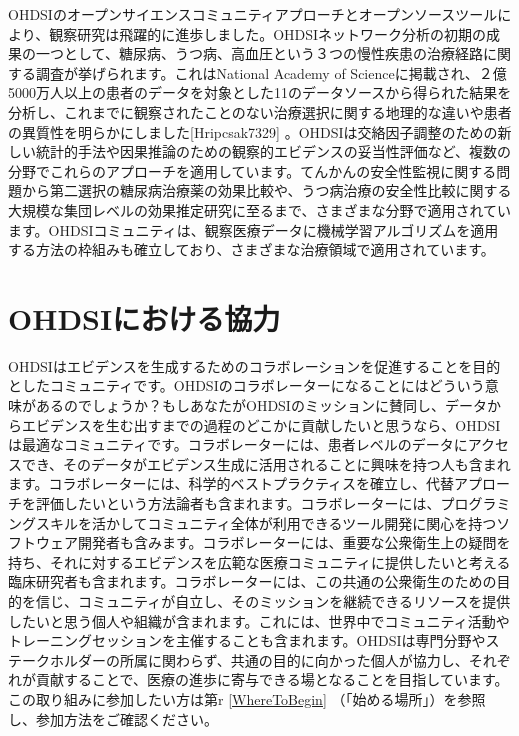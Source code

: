 \documentclass[
  11pt]{book}
\theoremstyle{definition}
\theoremstyle{definition}
\theoremstyle{definition}
\theoremstyle{definition}
\theoremstyle{remark}
\begin{document}
OHDSIのオープンサイエンスコミュニティアプローチとオープンソースツールにより、観察研究は飛躍的に進歩しました。OHDSIネットワーク分析の初期の成果の一つとして、糖尿病、うつ病、高血圧という３つの慢性疾患の治療経路に関する調査が挙げられます。これはNational Academy of Scienceに掲載され、２億5000万人以上の患者のデータを対象とした11のデータソースから得られた結果を分析し、これまでに観察されたことのない治療選択に関する地理的な違いや患者の異質性を明らかにしました{[}Hripcsak7329{]} 。OHDSIは交絡因子調整のための新しい統計的手法\citep{tian_2018}や因果推論のための観察的エビデンスの妥当性評価\citep{schuemie_2018}など、複数の分野でこれらのアプローチを適用しています。てんかんの安全性監視に関する問題\citep{duke_2017}から第二選択の糖尿病治療薬の効果比較\citep{vashisht_2018}や、うつ病治療の安全性比較に関する大規模な集団レベルの効果推定研究\citep{schuemie_2018b}に至るまで、さまざまな分野で適用されています。OHDSIコミュニティは、観察医療データに機械学習アルゴリズムを適用する方法の枠組みも確立しており\citep{reps2018}、さまざまな治療領域で適用されています。\citep{johnston_2019, cepeda_2018, reps_2019}

\section{OHDSIにおける協力}\label{ohdsiux306bux304aux3051ux308bux5354ux529b}

OHDSIはエビデンスを生成するためのコラボレーションを促進することを目的としたコミュニティです。OHDSIのコラボレーターになることにはどういう意味があるのでしょうか？もしあなたがOHDSIのミッションに賛同し、データからエビデンスを生む出すまでの過程のどこかに貢献したいと思うなら、OHDSIは最適なコミュニティです。コラボレーターには、患者レベルのデータにアクセスでき、そのデータがエビデンス生成に活用されることに興味を持つ人も含まれます。コラボレーターには、科学的ベストプラクティスを確立し、代替アプローチを評価したいという方法論者も含まれます。コラボレーターには、プログラミングスキルを活かしてコミュニティ全体が利用できるツール開発に関心を持つソフトウェア開発者も含みます。コラボレーターには、重要な公衆衛生上の疑問を持ち、それに対するエビデンスを広範な医療コミュニティに提供したいと考える臨床研究者も含まれます。コラボレーターには、この共通の公衆衛生のための目的を信じ、コミュニティが自立し、そのミッションを継続できるリソースを提供したいと思う個人や組織が含まれます。これには、世界中でコミュニティ活動やトレーニングセッションを主催することも含まれます。OHDSIは専門分野やステークホルダーの所属に関わらず、共通の目的に向かった個人が協力し、それぞれが貢献することで、医療の進歩に寄与できる場となることを目指しています。この取り組みに参加したい方は第r \ref{WhereToBegin} （「始める場所」）を参照し、参加方法をご確認ください。
\end{document}

